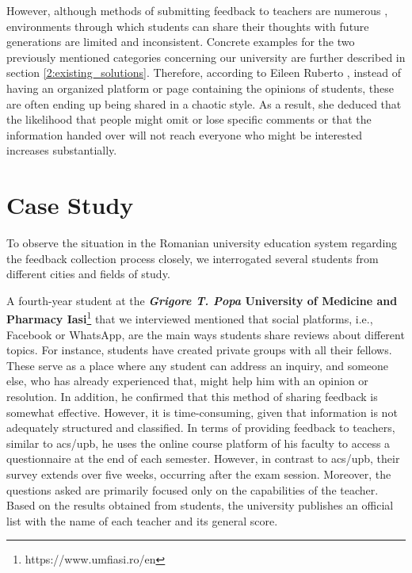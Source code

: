 	However, although methods of submitting feedback to teachers are numerous \cite{musharraf2016sabina}, environments through which students can share their thoughts with future generations are limited and inconsistent. Concrete examples for the two previously mentioned categories concerning our university are further described in section \ref{2:existing_solutions}. Therefore, according to Eileen Ruberto \cite{ruberto2018chaos}, instead of having an organized platform or page containing the opinions of students, these are often ending up being shared in a chaotic style. As a result, she deduced that the likelihood that people might omit or lose specific comments or that the information handed over will not reach everyone who might be interested increases substantially.
    
\section{Case Study} \label{2:case_study}
    
    To observe the situation in the Romanian university education system regarding the feedback collection process closely, we interrogated several students from different cities and fields of study.
    
	A fourth-year student at the \textbf{\textit{Grigore T. Popa} University of Medicine and Pharmacy Iasi}\footnote{https://www.umfiasi.ro/en} that we interviewed mentioned that social platforms, i.e., Facebook or WhatsApp, are the main ways students share reviews about different topics. For instance, students have created private groups with all their fellows. These serve as a place where any student can address an inquiry, and someone else, who has already experienced that, might help him with an opinion or resolution. In addition, he confirmed that this method of sharing feedback is somewhat effective. However, it is time-consuming, given that information is not adequately structured and classified. In terms of providing feedback to teachers, similar to \acrshort{acs}/\acrshort{upb}, he uses the online course platform of his faculty to access a questionnaire at the end of each semester. However, in contrast to \acrshort{acs}/\acrshort{upb}, their survey extends over five weeks, occurring after the exam session. Moreover, the questions asked are primarily focused only on the capabilities of the teacher. Based on the results obtained from students, the university publishes an official list with the name of each teacher and its general score.
	
